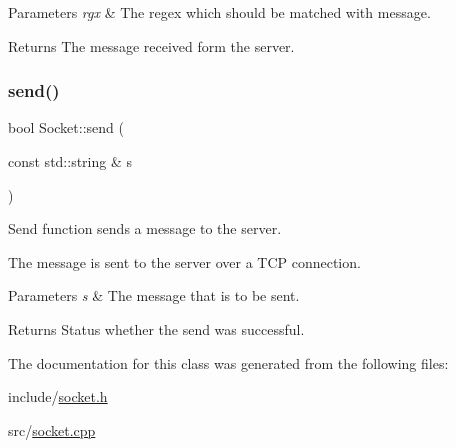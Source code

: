 \begin{DoxyParams}{Parameters}
{\em rgx} & The regex which should be matched with message. \\
\hline
\end{DoxyParams}
\begin{DoxyReturn}{Returns}
The message received form the server. 
\end{DoxyReturn}
\mbox{\label{classSocket_a51839591e6a25799d62170ac8b105348}} 
\subsubsection{\texorpdfstring{send()}{send()}}
{\footnotesize\ttfamily bool Socket\+::send (\begin{DoxyParamCaption}\item[{const std\+::string \&}]{s }\end{DoxyParamCaption})}



Send function sends a message to the server. 

The message is sent to the server over a T\+CP connection.


\begin{DoxyParams}{Parameters}
{\em s} & The message that is to be sent. \\
\hline
\end{DoxyParams}
\begin{DoxyReturn}{Returns}
Status whether the send was successful. 
\end{DoxyReturn}


The documentation for this class was generated from the following files\+:\begin{DoxyCompactItemize}
\item 
include/\hyperlink{socket_8h}{socket.\+h}\item 
src/\hyperlink{socket_8cpp}{socket.\+cpp}\end{DoxyCompactItemize}
